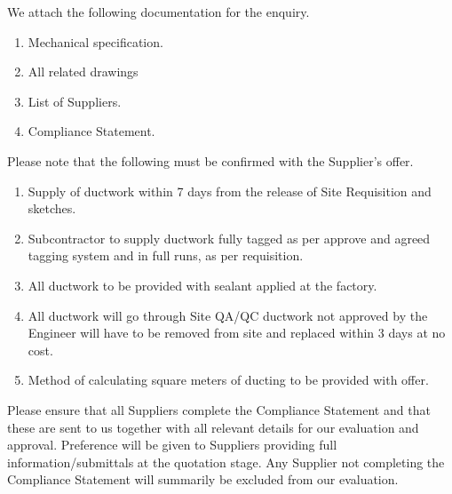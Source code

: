 \documentclass[a4paper,12pt,oneside]{article}
\begin{document}
\begin{mcdletter}

We attach the following documentation for the enquiry.

\begin{enumerate}    
\item Mechanical specification.
\item All related drawings
\item List of Suppliers.
\item Compliance Statement.
\end{enumerate}

Please note that the following must be confirmed  with the Supplier's offer.

\begin{enumerate}
\item Supply of ductwork within 7 days from the release of Site Requisition and sketches.

\item Subcontractor to supply ductwork fully tagged as per approve and agreed tagging system and in full runs, as per requisition.

\item All ductwork to be provided with sealant applied at the factory.

\item All ductwork will go through Site QA/QC ductwork not approved by the Engineer will have to be removed from site and replaced within 3 days at no cost.

\item Method of calculating square meters of ducting to be provided with offer. 

\end{enumerate}

Please ensure that all Suppliers complete the Compliance Statement and that these are sent to us together with all relevant details for our evaluation and approval. Preference will be given to Suppliers providing full information/submittals at the quotation stage. Any Supplier not completing the Compliance Statement will summarily be excluded from our evaluation.
\end{mcdletter}
\end{document}
